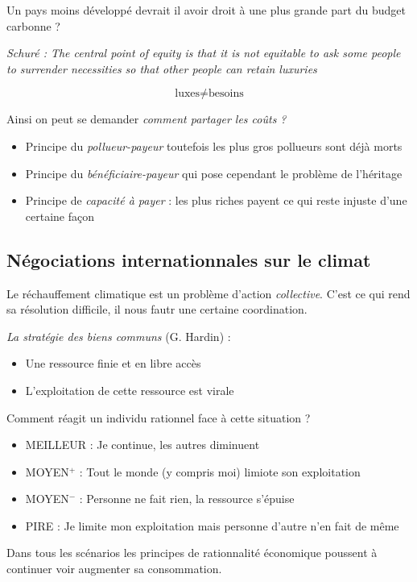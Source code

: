 \documentclass {article}
\newcommand{\V}[0]{\vspace{1\baselineskip}}
\begin{document}
Un pays moins développé devrait il avoir droit à une plus grande part du budget carbonne ?
\V

\textit{Schuré : The central point of equity is that it is not equitable to ask some people to surrender necessities so that other people can retain luxuries}

$$\boxed{\textrm{luxes} \neq \textrm{besoins}}$$

Ainsi on peut se demander \textit{comment partager les coûts ?}
\begin{itemize}
\item Principe du \emph{pollueur-payeur} toutefois les plus gros pollueurs sont déjà morts
\item Principe du \emph{bénéficiaire-payeur} qui pose cependant le problème de l'héritage
\item Principe de \emph{capacité à payer} : les plus riches payent ce qui reste injuste d'une certaine façon
\end{itemize}
\bigskip

\subsection{Négociations internationnales sur le climat}
\bigskip
Le réchauffement climatique est un problème d'action \emph{collective}. C'est ce qui rend sa résolution difficile, il nous fautr une certaine coordination.
\V

\textit{La stratégie des biens communs } (G. Hardin) :
\begin{itemize}
\item Une ressource finie et en libre accès
\item L'exploitation de cette ressource est virale
\end{itemize}
\V

Comment réagit un individu rationnel face à cette situation ?

\begin{itemize}
\item MEILLEUR : Je continue, les autres diminuent
\item MOYEN$^+$ : Tout le monde (y compris moi) limiote son exploitation
\item MOYEN$^-$ : Personne ne fait rien, la ressource s'épuise
\item PIRE : Je limite mon exploitation mais personne d'autre n'en fait de même
\end{itemize}
\V

Dans tous les scénarios les principes de rationnalité économique poussent à continuer voir augmenter sa consommation.
\V
\end{document}
